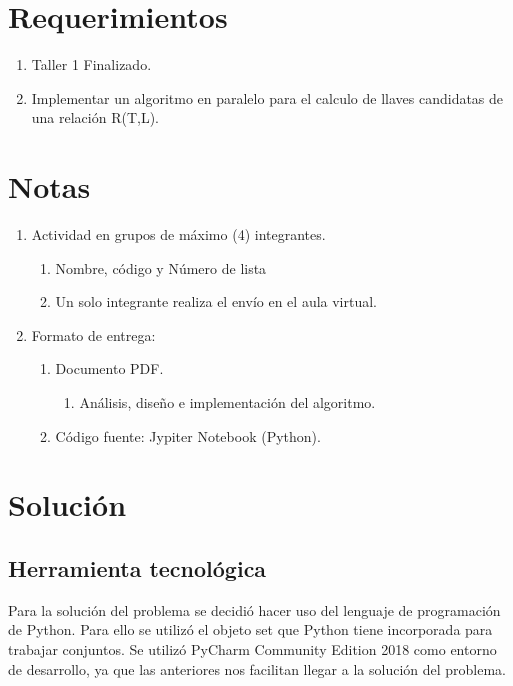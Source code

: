 \documentclass[a4paper,12pt]{article}
\begin{document}
{\newpage


\tableofcontents

\newpage



\section{Requerimientos}
\begin{enumerate}
\item Taller 1 Finalizado.
\item Implementar un algoritmo en paralelo para el calculo de llaves candidatas de una relación R(T,L).
\end{enumerate}

\section{Notas}

\begin{enumerate}
\item Actividad en grupos de máximo (4)  integrantes.
\begin{enumerate}
\item Nombre, código y Número de lista
\item Un solo integrante realiza el envío en el aula virtual.
\end{enumerate}
\item Formato de entrega: 
\begin{enumerate}
\item Documento PDF.
\begin{enumerate}
\item Análisis, diseño e implementación del algoritmo.
\end{enumerate}
\item Código fuente: Jypiter Notebook (Python).
\end{enumerate}
\end{enumerate}

\section{Solución}

\subsection{Herramienta tecnológica}
Para la solución del problema se decidió hacer uso del lenguaje de programación de Python. Para ello se utilizó el objeto set que Python tiene incorporada para trabajar conjuntos. Se utilizó PyCharm Community Edition 2018 como entorno de desarrollo, ya que las anteriores nos facilitan llegar a la solución del problema. 


}
\end{document}
